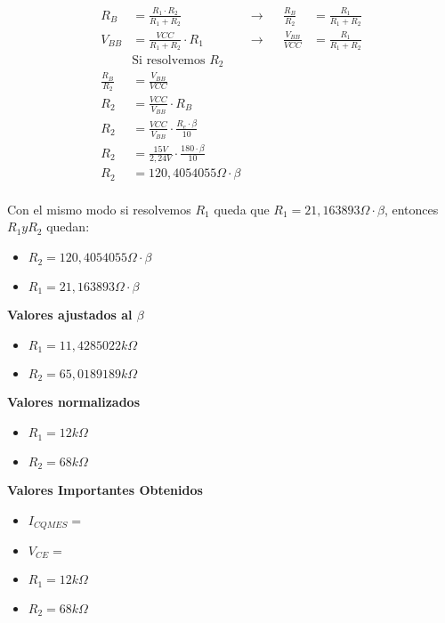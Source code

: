 \begin{multicols}{2}
			\begin{align*}
				R_B &= \frac{R_1 \cdot R_2}{R_1 + R_2} &\longrightarrow&  &\frac{R_B}{R_2} &= \frac{R_1}{R_1 + R_2}\\
				V_{BB} &= \frac{VCC}{R_1 + R_2} \cdot R_1  &\longrightarrow& &\frac{V_{BB}}{VCC} &= \frac {R_1}{R_1 + R_2}\\
				&\text{Si resolvemos $R_2$}\\
				\frac{R_B}{R_2} &= \frac{V_{BB}}{VCC}\\
				R_2 &= \frac{VCC}{V_{BB}} \cdot R_B\\
				R_2 &= \frac{VCC}{V_{BB}} \cdot \frac{R_e \cdot \beta}{10}\\
				R_2 &= \frac{15 V}{2,24 V} \cdot \frac{180 \cdot \beta}{10}\\
				R_2 &= 120,4054055 \Omega \cdot \beta\\
			\end{align*}

			\sangria{} Con el mismo modo si resolvemos $R_1$ queda que $R_1=21,163893\Omega \cdot \beta$, entonces $R_1 y R_2$ quedan:

			\begin{itemize}[nosep]
				\item $R_2 = 120,4054055\Omega \cdot \beta$\\
				\item $R_1 = 21,163893\Omega \cdot \beta$
            \end{itemize}

\newpage

            \textbf{Valores ajustados al $\beta$}
            \begin{itemize}
				\item $R_1 = 11,4285022 k\Omega$\\
				\item $R_2 = 65,0189189 k\Omega$\\
			\end{itemize}


            \textbf{Valores normalizados}
            \begin{itemize}
				\item $R_1 = 12 k\Omega$\\
				\item $R_2 = 68 k\Omega$\\
			\end{itemize}

			\textbf{Valores Importantes Obtenidos}
            \begin{itemize}
            	\item $I_{CQMES} = $\\
            	\item $V_{CE} = $\\
				\item $R_1 = 12 k\Omega$\\
				\item $R_2 = 68 k\Omega$\\
			\end{itemize}



\end{multicols}
